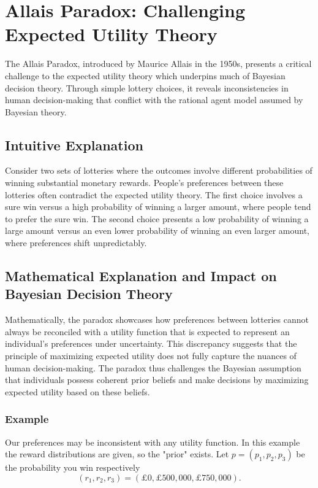 \documentclass{article}
\begin{document}
\section{Allais Paradox: Challenging Expected Utility Theory}

The Allais Paradox, introduced by Maurice Allais in the 1950s, presents a critical challenge to the expected utility theory which underpins much of Bayesian decision theory. Through simple lottery choices, it reveals inconsistencies in human decision-making that conflict with the rational agent model assumed by Bayesian theory.

\subsection{Intuitive Explanation}
Consider two sets of lotteries where the outcomes involve different probabilities of winning substantial monetary rewards. People's preferences between these lotteries often contradict the expected utility theory. The first choice involves a sure win versus a high probability of winning a larger amount, where people tend to prefer the sure win. The second choice presents a low probability of winning a large amount versus an even lower probability of winning an even larger amount, where preferences shift unpredictably.

\subsection{Mathematical Explanation and Impact on Bayesian Decision Theory}
Mathematically, the paradox showcases how preferences between lotteries cannot always be reconciled with a utility function that is expected to represent an individual's preferences under uncertainty. This discrepancy suggests that the principle of maximizing expected utility does not fully capture the nuances of human decision-making. The paradox thus challenges the Bayesian assumption that individuals possess coherent prior beliefs and make decisions by maximizing expected utility based on these beliefs.

\subsubsection{Example}
Our preferences may be inconsistent with any utility function. In this example the reward distributions are given, so the "prior" exists. Let $p=\left(p_1, p_2, p_3\right)$ be the probability you win respectively
$$
\left(r_1, r_2, r_3\right)=(£ 0, £ 500,000, £ 750,000) .
$$
\end{document}

